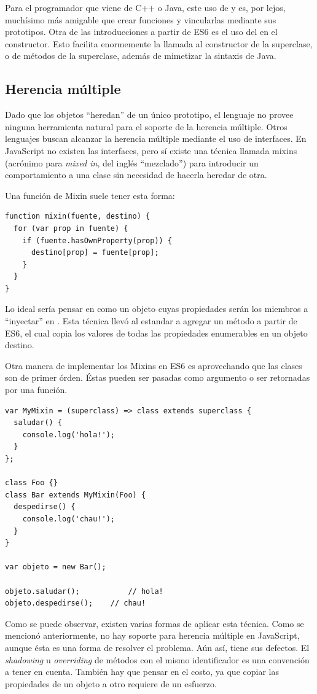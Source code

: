 Para el programador que viene de C++ o Java, este uso de  y  es, por lejos, muchísimo más amigable que crear funciones y vincularlas mediante sus prototipos. Otra de las introducciones a partir de ES6 es el uso del  en el constructor. Esto facilita enormemente la llamada al constructor de la superclase, o de métodos de la superclase, además de mimetizar la sintaxis de Java. 

\subsection{Herencia múltiple}

Dado que los objetos "`heredan"' de un único prototipo, el lenguaje no provee ninguna herramienta natural para el soporte de la herencia múltiple. Otros lenguajes buscan alcanzar la herencia múltiple mediante el uso de interfaces. En JavaScript no existen las interfaces, pero sí existe una técnica llamada mixins (acrónimo para \textit{mixed in}, del inglés "`mezclado"') para introducir un comportamiento a una clase sin necesidad de hacerla heredar de otra.

Una función de Mixin suele tener esta forma:

\begin{lstlisting}[title={Función de Mixin}]
function mixin(fuente, destino) {  
  for (var prop in fuente) {
    if (fuente.hasOwnProperty(prop)) {
      destino[prop] = fuente[prop];
    }
  }
}
\end{lstlisting}

Lo ideal sería pensar en  como un objeto cuyas propiedades serán los miembros a "`inyectar"' en . Esta técnica llevó al estandar a agregar un método  a partir de ES6, el cual copia los valores de todas las propiedades enumerables en un objeto destino.

Otra manera de implementar los Mixins en ES6 es aprovechando que las clases son de primer órden. Éstas pueden ser pasadas como argumento o ser retornadas por una función.

\begin{lstlisting}[title={Haciendo uso de \code{class} como expresión}]
var MyMixin = (superclass) => class extends superclass {  
  saludar() {
    console.log('hola!');
  }
};

class Foo {}
class Bar extends MyMixin(Foo) {
  despedirse() {
    console.log('chau!');
  }
}

var objeto = new Bar();

objeto.saludar();			// hola!
objeto.despedirse();	// chau!
\end{lstlisting}

Como se puede observar, existen varias formas de aplicar esta técnica. Como se mencionó anteriormente, no hay soporte para herencia múltiple en JavaScript, aunque ésta es una forma de resolver el problema. Aún así, tiene sus defectos. El \textit{shadowing} u \textit{overriding} de métodos con el mismo identificador es una convención a tener en cuenta. También hay que pensar en el costo, ya que copiar las propiedades de un objeto a otro requiere de un esfuerzo.
